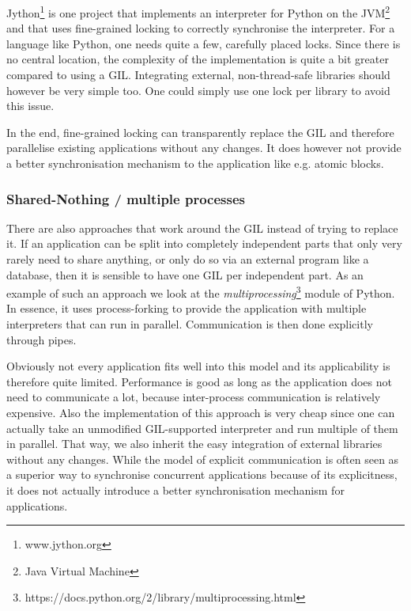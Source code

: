 \documentclass{sigplanconf}
\begin{document}
Jython\footnote{www.jython.org} is one project that implements an
interpreter for Python on the JVM\footnote{Java Virtual Machine} and
that uses fine-grained locking to correctly synchronise the
interpreter. For a language like Python, one needs quite a few,
carefully placed locks. Since there is no central location, the
complexity of the implementation is quite a bit greater compared to
using a GIL. Integrating external, non-thread-safe libraries should
however be very simple too.  One could simply use one lock per library
to avoid this issue.

In the end, fine-grained locking can transparently replace the GIL
and therefore parallelise existing applications without any
changes. It does however not provide a better synchronisation
mechanism to the application like e.g. atomic blocks.


\subsubsection{Shared-Nothing / multiple processes}

There are also approaches that work around the GIL instead of trying
to replace it. If an application can be split into completely
independent parts that only very rarely need to share anything, or
only do so via an external program like a database, then it is
sensible to have one GIL per independent part. As an example of such
an approach we look at the
\emph{multiprocessing}\footnote{https://docs.python.org/2/library/multiprocessing.html}
module of Python. In essence, it uses process-forking to provide the
application with multiple interpreters that can run in parallel.
Communication is then done explicitly through pipes.

Obviously not every application fits well into this model and its
applicability is therefore quite limited. Performance is good as
long as the application does not need to communicate a lot, because
inter-process communication is relatively expensive. Also the
implementation of this approach is very cheap since one can
actually take an unmodified GIL-supported interpreter and run
multiple of them in parallel. That way, we also inherit the
easy integration of external libraries without any changes.
While the model of explicit communication is often seen as a
superior way to synchronise concurrent applications because
of its explicitness, it does not actually introduce a better
synchronisation mechanism for applications.
\end{document}
